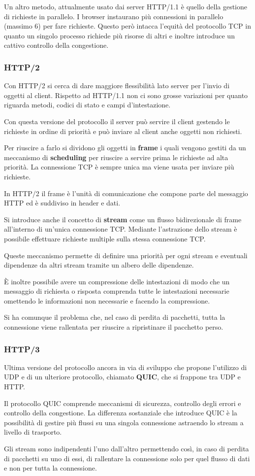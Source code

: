 Un altro metodo, attualmente usato dai server HTTP/1.1 è quello della gestione di richieste in 
parallelo. I browser instaurano più connessioni in parallelo (massimo 6) per fare richieste. Questo
però intacca l'equità del protocollo TCP in quanto un singolo processo richiede più risorse di 
altri e inoltre introduce un cattivo controllo della congestione.

\subsubsection{HTTP/2}
Con HTTP/2 si cerca di dare maggiore flessibilità lato server per l'invio di oggetti al client.
Rispetto ad HTTP/1.1 non ci sono grosse variazioni per quanto riguarda metodi, codici di stato e
campi d'intestazione.

Con questa versione del protocollo il server può servire il client gestendo le richieste in ordine
di priorità e può inviare al client anche oggetti non richiesti.

Per riuscire a farlo si dividono gli oggetti in \textbf{frame} i quali vengono gestiti da un 
meccanismo di \textbf{scheduling} per riuscire a servire prima le richieste ad alta priorità. La
connessione TCP è sempre unica ma viene usata per inviare più richieste.

In HTTP/2 il frame è l'unità di comunicazione che compone parte del messaggio HTTP ed è suddiviso
in header e dati.

Si introduce anche il concetto di \textbf{stream} come un flusso bidirezionale di frame all'interno
di un'unica connessione TCP. Mediante l'astrazione dello stream è possibile effettuare richieste 
multiple sulla stessa connessione TCP.

Queste meccanismo permette di definire una priorità per ogni stream e eventuali dipendenze da altri
stream tramite un albero delle dipendenze.

\`E inoltre possibile avere un compressione delle intestazioni di modo che un messaggio di 
richiesta o risposta comprenda tutte le intestazioni necessarie omettendo le informazioni non 
necessarie e facendo la compressione.

Si ha comunque il problema che, nel caso di perdita di pacchetti, tutta la connessione viene
rallentata per riuscire a ripristinare il pacchetto perso.

\subsubsection{HTTP/3}
Ultima versione del protocollo ancora in via di sviluppo che propone l'utilizzo di UDP e di un 
ulteriore protocollo, chiamato \textbf{QUIC}, che si frappone tra UDP e HTTP.

Il protocollo QUIC comprende meccanismi di sicurezza, controllo degli errori e controllo della
congestione. La differenza sostanziale che introduce QUIC è la possibilità di gestire più flussi
su una singola connessione astraendo lo stream a livello di trasporto.

Gli stream sono indipendenti l'uno dall'altro permettendo così, in caso di perdita di pacchetti
su uno di essi, di rallentare la connessione solo per quel flusso di dati e non per tutta la 
connessione.
